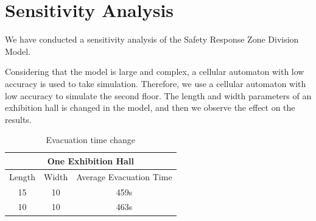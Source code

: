 \section{Sensitivity Analysis}

We have conducted a sensitivity analysis of the Safety Response Zone Division Model.

Considering that the model is large and complex, a cellular automaton with low accuracy is used to take simulation. Therefore, we use a cellular automaton with low accuracy to simulate the second floor. The length and width parameters of an exhibition hall is changed in the model, and then we observe the effect on the results.

    \begin{figure}[H]
    \centering
    \centering
    \centering
    \end{figure}


\begin{table}[!htbp]
\centering
\begin{tabular}{|c|c|c|}
\hline
\multicolumn{3}{|c|}{One Exhibition Hall}\\ %
\hline
Length&Width&Average Evacuation Time\\
\hline
15& 10& 459s\\
\hline
10& 10& 463s\\
\hline
\end{tabular}
\caption{Evacuation time change}
\end{table}


